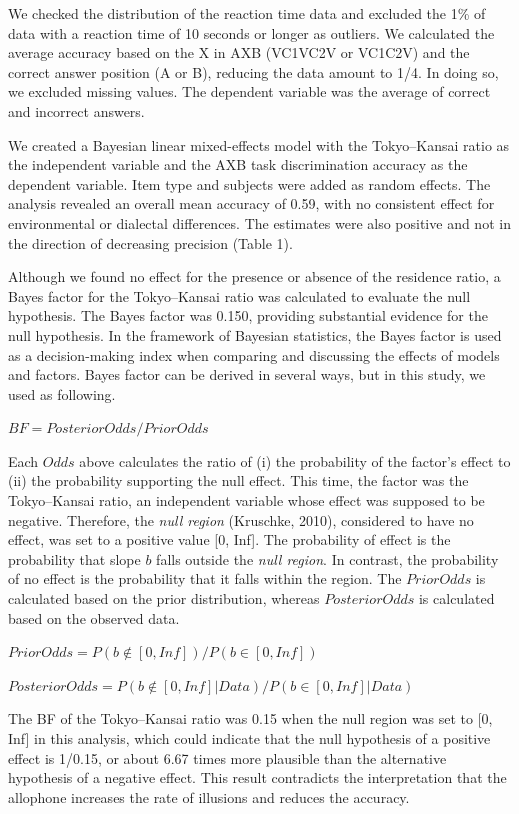 \documentclass[a4paper,11pt,twocolumn]{article}
\begin{document}
We checked the distribution of the reaction time data and excluded the 1\% of data with a reaction time of 10 seconds or longer as outliers. We calculated the average accuracy based on the X in AXB (VC1VC2V or VC1C2V) and the correct answer position (A or B), reducing the data amount to 1/4. In doing so, we excluded missing values. The dependent variable was the average of correct and incorrect answers.

We created a Bayesian linear mixed-effects model \cite{lme4, rstanarm, easystats} with the Tokyo--Kansai ratio as the independent variable and the AXB task discrimination accuracy as the dependent variable. Item type and subjects were added as random effects. The analysis revealed an overall mean accuracy of 0.59, with no consistent effect for environmental or dialectal differences. The estimates were also positive and not in the direction of decreasing precision (Table 1).

Although we found no effect for the presence or absence of the residence ratio, a Bayes factor for the Tokyo--Kansai ratio was calculated to evaluate the null hypothesis. The Bayes factor was 0.150, providing substantial evidence for the null hypothesis. In the framework of Bayesian statistics, the Bayes factor is used as a decision-making index when comparing and discussing the effects of models and factors. Bayes factor can be derived in several ways, but in this study, we used as following.

$BF = Posterior Odds / Prior Odds$

Each $Odds$ above calculates the ratio of (i) the probability of the factor's effect to (ii) the probability supporting the null effect. This time, the factor was the Tokyo--Kansai ratio, an independent variable whose effect was supposed to be negative. Therefore, the \textit{null region} (Kruschke, 2010), considered to have no effect, was set to a positive value [0, Inf]. The probability of effect is the probability that slope $b$ falls outside the \textit{null region}. In contrast, the probability of no effect is the probability that it falls within the region. The $Prior Odds$ is calculated based on the prior distribution, whereas $Posterior Odds$ is calculated based on the observed data.

$Prior  Odds = P(b\notin[0, Inf]) / P(b\in[0, Inf])$

$Posterior Odds = P(b\notin[0, Inf] | Data) / P(b\in[0, Inf] | Data)$

The BF of the Tokyo--Kansai ratio was 0.15 when the null region was set to [0, Inf] in this analysis, which could indicate that the null hypothesis of a positive effect is 1/0.15, or about 6.67 times more plausible than the alternative hypothesis of a negative effect. This result contradicts the interpretation that the allophone increases the rate of illusions and reduces the accuracy.
\end{document}
